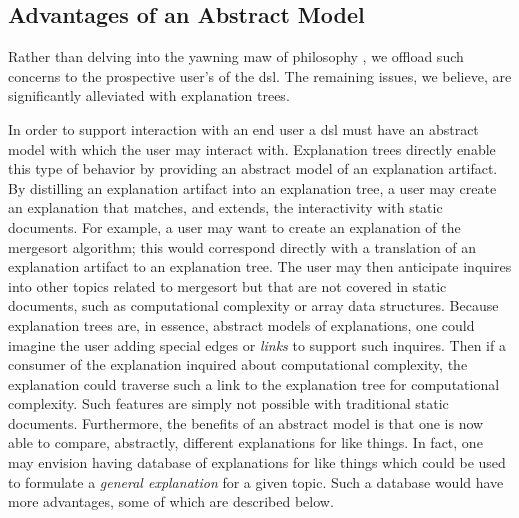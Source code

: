 \documentclass[sigconf]{acmart}
\begin{document}
\subsection{Advantages of an Abstract Model}
\label{sec:dis:model}

Rather than delving into the yawning maw of philosophy , we offload such concerns to the prospective user's
of the dsl. The remaining issues, we believe, are significantly alleviated with
explanation trees.

In order to support interaction with an end user a dsl must have an abstract
model with which the user may interact with. Explanation trees directly enable
this type of behavior by providing an abstract model of an explanation artifact.
%
By distilling an explanation artifact into an explanation tree, a user may
create an explanation that matches, and extends, the interactivity with static
documents. For example, a user may want to create an explanation of the
mergesort algorithm; this would correspond directly with a translation of an
explanation artifact to an explanation tree. The user may then anticipate
inquires into other topics related to mergesort but that are not covered in
static documents, such as computational complexity or array data structures.
%
Because explanation trees are, in essence, abstract models of explanations, one
could imagine the user adding special edges or \emph{links} to support such
inquires. Then if a consumer of the explanation inquired about computational
complexity, the explanation could traverse such a link to the explanation tree
for computational complexity. Such features are simply not possible with
traditional static documents.
%
Furthermore, the benefits of an abstract model is that one is now able to
compare, abstractly, different explanations for like things. In fact, one may
envision having database of explanations for like things which could be used to
formulate a \emph{general explanation} for a given topic. Such a database would
have more advantages, some of which are described below.
\end{document}

